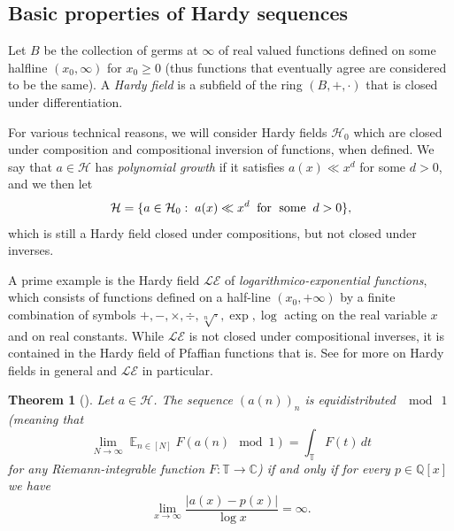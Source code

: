 \documentclass[11pt]{amsart}
\newtheorem{theorem}[lemma]{Theorem}
\theoremstyle{definition}
\DeclareMathOperator*{\E}{\mathbb{E}}
\newcommand{\C}{{\mathbb C}}
\newcommand{\Q}{{\mathbb Q}}
\newcommand{\T}{{\mathbb T}}
\newcommand{\CH}{{\mathcal H}}
\newcommand{\1}{{\mathbf{1}}}
\begin{document}
\subsection{Basic properties of Hardy sequences}\label{SS: Hardy}

Let $B$ be the collection of germs at $\infty$ of real valued functions defined on some halfline $(x_0,\infty)$ for $x_0\geq 0$ (thus functions that eventually agree are considered to be the same).  A \emph{Hardy field} is a subfield of the ring $(B, +, \cdot)$ that is closed under differentiation.
 
 For various technical reasons, we will consider Hardy fields $\mathcal{H}_0$ which are closed under composition and compositional inversion of functions, when defined. We say that $a\in\CH$ has \emph{polynomial growth} if it satisfies $a(x)\ll x^d$ for some $d>0$, and we then let
\begin{align*}
    \CH = \{a\in \CH_0:\; a(x) \ll x^d\;\; \textrm{for\; some}\;\; d>0\},
\end{align*}
which is still a Hardy field closed under compositions, but not closed under inverses.

A prime example is the Hardy field $\mathcal{LE}$ of \textit{logarithmico-exponential functions}, which consists of functions defined on a half-line $(x_0,+\infty)$ by a finite combination of symbols $+, -, \times, \div, \sqrt[n]{\cdot}, \exp, \log$ acting on the real variable $x$ and on real constants. While $\mathcal{LE}$ is not closed under compositional inverses, it is contained in the Hardy field of Pfaffian functions that is. See \cite{Fr10, Fr12, Hardy12} for more on Hardy fields in general and $\mathcal{LE}$ in particular. 


















\begin{theorem}[{\cite[Theorem 1.3]{Boshernitzan-equidistribution}}]\label{T: Boshernitzan}
    Let $a\in\mathcal{H}$. The sequence $(a(n))_n$ is equidistributed $\mod~\!1$ (meaning that $$\lim_{N\to\infty}\E_{n\in [N]}F(a(n)\!\!\! \mod 1)=\int_{\T} F(t)\,dt$$ for any Riemann-integrable function $F\colon\T\to\C$) if and only if for every $p\in \Q[x]$ we have \[\lim_{x\to \infty}\frac{|a(x)-p(x)|}{\log x}=\infty.\]
\end{theorem}
\end{document}
